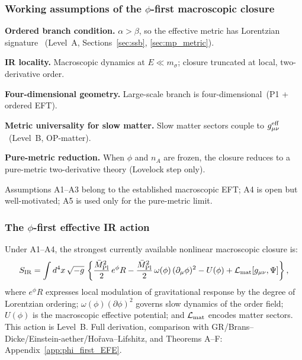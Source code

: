 \subsubsection*{Working assumptions of the $\phi$-first macroscopic closure}

\begin{description}[noitemsep,leftmargin=2.2em]
  \item[A1] \textbf{Ordered branch condition.}
    $\alpha>\beta$, so the effective metric has Lorentzian signature
    ~(Level~A, Sections~\ref{sec:ssb}, \ref{sec:mp_metric}).
  \item[A2] \textbf{IR locality.}
    Macroscopic dynamics at $E\ll m_\sigma$; closure truncated at local,
    two-derivative order.
  \item[A3] \textbf{Four-dimensional geometry.}
    Large-scale branch is four-dimensional~(P1 + ordered EFT).
  \item[A4] \textbf{Metric universality for slow matter.}
    Slow matter sectors couple to $g^{\rm eff}_{\mu\nu}$~(Level~B,
    OP-matter).
  \item[A5] \textbf{Pure-metric reduction.}
    When $\phi$ and $n_A$ are frozen, the closure reduces to a
    pure-metric two-derivative theory (Lovelock step only).
\end{description}
Assumptions A1--A3 belong to the established macroscopic EFT;
A4 is open but well-motivated; A5 is used only for the pure-metric limit.

\subsubsection*{The $\phi$-first effective IR action}

Under A1--A4, the strongest currently available nonlinear macroscopic
closure is:
\begin{equation}
  \label{eq:phi_first_action}
  S_{\rm IR}
  = \int d^4x\,\sqrt{-g}\,
  \left\{
    \frac{\bar M_{\rm Pl}^2}{2}\,e^\phi R
    - \frac{\bar M_{\rm Pl}^2}{2}\,\omega(\phi)\,(\partial_\mu\phi)^2
    - U(\phi)
    + \mathcal{L}_{\rm mat}[g_{\mu\nu},\Psi]
  \right\},
\end{equation}
where $e^\phi R$ expresses local modulation of gravitational response
by the degree of Lorentzian ordering; $\omega(\phi)(\partial\phi)^2$
governs slow dynamics of the order field; $U(\phi)$ is the macroscopic
effective potential; and $\mathcal{L}_{\rm mat}$ encodes matter sectors.
This action is Level~B.
Full derivation, comparison with GR/Brans--Dicke/Einstein-aether/Ho\v{r}ava--Lifshitz,
and Theorems A--F: Appendix~\ref{app:phi_first_EFE}.

